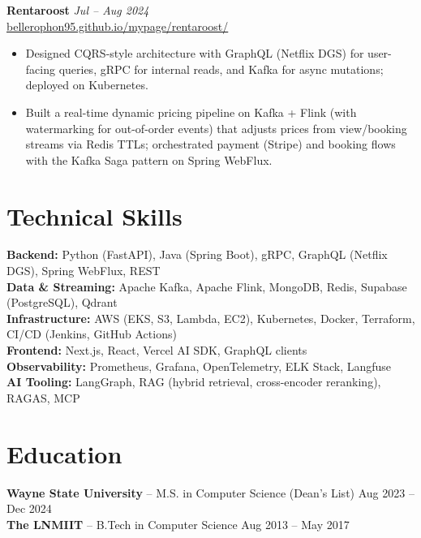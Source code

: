 \documentclass[10pt,letterpaper]{article}
\newcommand{\project}[3]{%
  \vspace{2pt}
  \noindent\textbf{#1} \hfill \textit{#2} \\
  {\small #3}
  \vspace{1pt}
}
\begin{document}
\project{Rentaroost}{Jul -- Aug 2024}{\href{https://bellerophon95.github.io/mypage/rentaroost/}{bellerophon95.github.io/mypage/rentaroost/}}
\begin{itemize}
  \item Designed CQRS-style architecture with GraphQL (Netflix DGS) for user-facing queries, gRPC for internal reads, and Kafka for async mutations; deployed on Kubernetes.
  \item Built a real-time dynamic pricing pipeline on Kafka + Flink (with watermarking for out-of-order events) that adjusts prices from view/booking streams via Redis TTLs; orchestrated payment (Stripe) and booking flows with the Kafka Saga pattern on Spring WebFlux.
\end{itemize}

\section{Technical Skills}

\noindent\textbf{Backend:} Python (FastAPI), Java (Spring Boot), gRPC, GraphQL (Netflix DGS), Spring WebFlux, REST \\
\textbf{Data \& Streaming:} Apache Kafka, Apache Flink, MongoDB, Redis, Supabase (PostgreSQL), Qdrant \\
\textbf{Infrastructure:} AWS (EKS, S3, Lambda, EC2), Kubernetes, Docker, Terraform, CI/CD (Jenkins, GitHub Actions) \\
\textbf{Frontend:} Next.js, React, Vercel AI SDK, GraphQL clients \\
\textbf{Observability:} Prometheus, Grafana, OpenTelemetry, ELK Stack, Langfuse \\
\textbf{AI Tooling:} LangGraph, RAG (hybrid retrieval, cross-encoder reranking), RAGAS, MCP

\section{Education}

\noindent\textbf{Wayne State University} -- M.S. in Computer Science (Dean's List) \hfill Aug 2023 -- Dec 2024 \\
\textbf{The LNMIIT} -- B.Tech in Computer Science \hfill Aug 2013 -- May 2017
\end{document}
